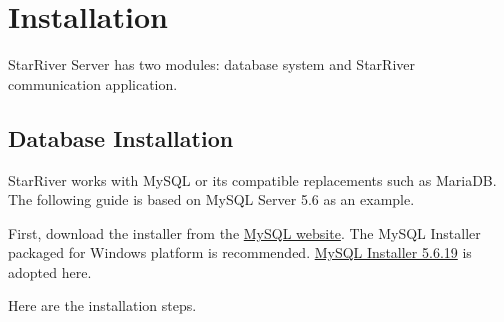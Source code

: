 \section{Installation}\label{installation}

StarRiver Server has two modules: database system and StarRiver
communication application.

\subsection{Database Installation}\label{database-installation}

StarRiver works with MySQL or its compatible replacements such as
MariaDB. The following guide is based on MySQL Server 5.6 as an example.

First, download the installer from the
\href{http://dev.mysql.com/downloads/mysql/}{MySQL website}. The MySQL
Installer packaged for Windows platform is recommended.
\href{http://dev.mysql.com/downloads/windows/installer/5.6.html}{MySQL
Installer 5.6.19} is adopted here.

Here are the installation steps.

